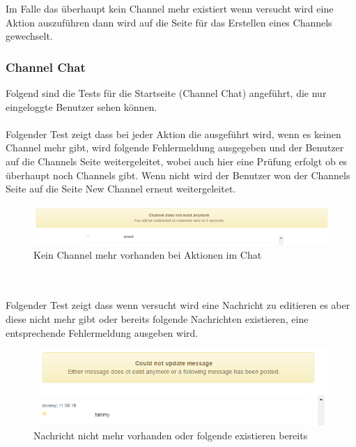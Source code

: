 \documentclass[11pt, a4paper, twoside]{article}   	%
\begin{document}
Im Falle das überhaupt kein Channel mehr existiert wenn versucht wird eine Aktion auszuführen dann wird auf die Seite für das Erstellen eines Channels gewechselt.
\newpage

\subsubsection{Channel Chat}
Folgend sind die Tests für die Startseite (Channel Chat) angeführt, die nur eingeloggte Benutzer sehen können.\\\\
Folgender Test zeigt dass bei jeder Aktion die ausgeführt wird, wenn es keinen Channel mehr gibt, wird folgende Fehlermeldung ausgegeben und der Benutzer auf die Channels Seite weitergeleitet, wobei auch hier eine Prüfung erfolgt ob es überhaupt noch Channels gibt. Wenn nicht wird der Benutzer won der Channels Seite auf die Seite New Channel erneut weitergeleitet.
\begin{figure}[h]
	\centering
	\includegraphics[scale=0.5]{images/start_channel_chat_no_channel_on_action.PNG}
	\caption
	{Kein Channel mehr vorhanden bei Aktionen im Chat}
\end{figure}\\\\

Folgender Test zeigt dass wenn versucht wird eine Nachricht zu editieren es aber diese nicht mehr gibt oder bereits folgende Nachrichten existieren, eine entsprechende Fehlermeldung ausgeben wird.
\begin{figure}[h]
	\centering
	\includegraphics[scale=0.5]{images/start_channel_chat_no_message_or_following.PNG}
	\caption
	{Nachricht nicht mehr vorhanden oder folgende existieren bereits}
\end{figure}\\\\
\end{document}
